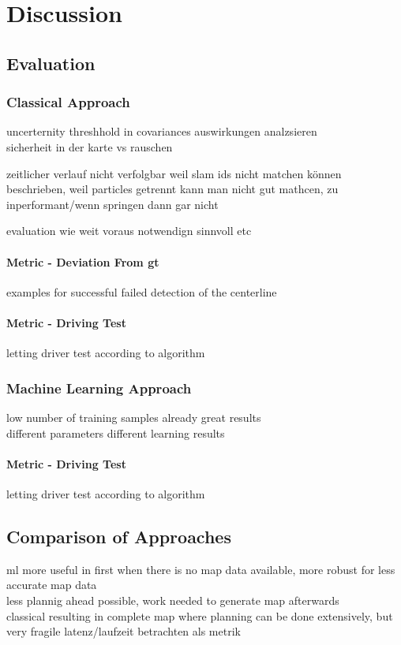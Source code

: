 \chapter{Discussion}

\section{Evaluation}
\subsection{Classical Approach}
uncerternity threshhold in covariances auswirkungen analzsieren\\
sicherheit in der karte vs rauschen

zeitlicher verlauf nicht verfolgbar weil
slam ids nicht matchen können beschrieben,
weil particles getrennt kann man nicht gut mathcen,
zu inperformant/wenn springen dann gar nicht

evaluation wie weit voraus notwendign sinnvoll etc
\subsubsection{Metric - Deviation From \ac{gt}}
examples for successful failed detection of the centerline
\subsubsection{Metric - Driving Test}
letting driver test according to algorithm


\subsection{Machine Learning Approach}

low number of training samples already great results\\
different parameters different learning results


\subsubsection{Metric - Driving Test}
letting driver test according to algorithm

\section{Comparison of Approaches}
ml more useful in first when there is no map data available, more robust for less accurate map data\\
less plannig ahead possible, work needed to generate map afterwards\\
classical resulting in complete map where planning can be done extensively, but very fragile
latenz/laufzeit betrachten als metrik

